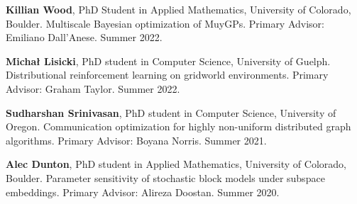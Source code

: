 \begin{innerlist}
  \item[] \textbf{Killian Wood},
  PhD Student in Applied Mathematics,
  University of Colorado, Boulder.
  Multiscale Bayesian optimization of MuyGPs.
  Primary Advisor: Emiliano Dall'Anese.
  Summer 2022.

  \item[] \textbf{Micha{\l}
    Lisicki},
  PhD student in Computer Science,
  University of Guelph.
  Distributional reinforcement learning on gridworld environments.
  Primary Advisor: Graham Taylor.
  Summer 2022.

  \item[] \textbf{Sudharshan Srinivasan},
  PhD student in Computer Science,
  University of Oregon.
  Communication optimization for highly non-uniform distributed graph algorithms.
  Primary Advisor: Boyana Norris.
  Summer 2021.

  \item[] \textbf{Alec Dunton},
  PhD student in Applied Mathematics,
  University of Colorado, Boulder.
  Parameter sensitivity of stochastic block models under subspace embeddings.
  Primary Advisor: Alireza Doostan.
  Summer 2020.

\end{innerlist}
